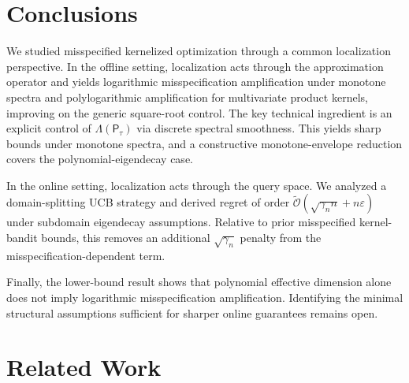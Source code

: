\documentclass{article}
\numberwithin{theorem}{section}
\theoremstyle{definition}
\begin{document}
\section{Conclusions}

We studied misspecified kernelized optimization through a common localization perspective. In the offline setting, localization acts through the approximation operator and yields logarithmic misspecification amplification under monotone spectra and polylogarithmic amplification for multivariate product kernels, improving on the generic square-root control. The key technical ingredient is an explicit control of $\Lambda(\mathsf{P}_{\tau})$ via discrete spectral smoothness. This yields sharp bounds under monotone spectra, and a constructive monotone-envelope reduction covers the polynomial-eigendecay case.

In the online setting, localization acts through the query space. We analyzed a domain-splitting UCB strategy and derived regret of order $\widetilde{\mathcal O}(\sqrt{\gamma_n n}+n\varepsilon)$ under subdomain eigendecay assumptions. Relative to prior misspecified kernel-bandit bounds, this removes an additional $\sqrt{\gamma_n}$ penalty from the misspecification-dependent term.

Finally, the lower-bound result shows that polynomial effective dimension alone does not imply logarithmic misspecification amplification. Identifying the minimal structural assumptions sufficient for sharper online guarantees remains open.












\appendix

\section{Related Work}\label{sec:related}
\end{document}
